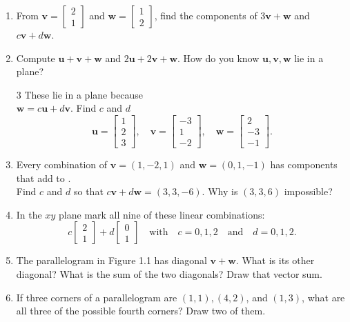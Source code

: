 \documentclass[14pt, a4paper]{article}
\begin{document}
\begin{enumerate}
    \item From $\boldsymbol{v} = \begin{bmatrix} 2 \\ 1 \end{bmatrix}$ and $\boldsymbol{w} = \begin{bmatrix} 1 \\ 2 \end{bmatrix}$, find the components of $3\boldsymbol{v} + \boldsymbol{w}$ and $c\boldsymbol{v} + d\boldsymbol{w}$.
    \item Compute $\boldsymbol{u} + \boldsymbol{v} + \boldsymbol{w}$ and $2\boldsymbol{u} + 2\boldsymbol{v} + \boldsymbol{w}$. How do you know $\boldsymbol{u}, \boldsymbol{v}, \boldsymbol{w}$ lie in a plane?
          \begin{multicols}{3}%
              These lie in a plane because
              \\$\boldsymbol{w} = c\boldsymbol{u} + d\boldsymbol{v}$. Find $c$ and $d$
                  \columnbreak
              $$
              \boldsymbol{u} = \begin{bmatrix} 1 \\ 2 \\ 3 \end{bmatrix}, \quad \boldsymbol{v} = \begin{bmatrix} -3 \\ 1 \\ -2 \end{bmatrix}, \quad \boldsymbol{w} = \begin{bmatrix} 2 \\ -3 \\ -1 \end{bmatrix}.
              $$
          \end{multicols}
    \item Every combination of $\boldsymbol{v} = (1, -2, 1)$ and $\boldsymbol{w} = (0, 1, -1)$ has components that add to \underline{\hspace{1cm}}.
          \\Find $c$ and $d$ so that $c\boldsymbol{v} + d\boldsymbol{w} = (3, 3, -6)$. Why is $(3, 3, 6)$ impossible?

    \item In the $xy$ plane mark all nine of these linear combinations:
          $$
              c\begin{bmatrix} 2 \\ 1 \end{bmatrix} + d\begin{bmatrix} 0 \\ 1 \end{bmatrix} \quad \text{with} \quad c = 0,1,2 \quad \text{and} \quad d = 0,1,2.
          $$

    \item The parallelogram in Figure 1.1 has diagonal $\boldsymbol{v} + \boldsymbol{w}$. What is its other diagonal? What is the sum of the two diagonals? Draw that vector sum.

    \item If three corners of a parallelogram are $(1,1), (4,2)$, and $(1,3)$, what are all three of the possible fourth corners? Draw two of them.
\end{enumerate}
\end{document}

